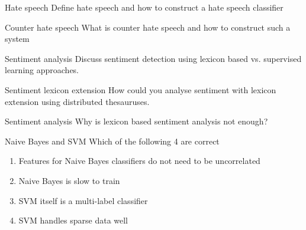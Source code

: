 \documentclass{article}
\begin{document}
\begin{exercise}{Hate speech}
  Define hate speech and how to construct a hate speech classifier

  \begin{solution}
  \end{solution}
\end{exercise}

\begin{exercise}{Counter hate speech}
  What is counter hate speech and how to construct such a system

  \begin{solution}
  \end{solution}
\end{exercise}

\begin{exercise}{Sentiment analysis}
  Discuss sentiment detection using lexicon based vs. supervised learning approaches.

  \begin{solution}
  \end{solution}
\end{exercise}

\begin{exercise}{Sentiment lexicon extension}
  How could you analyse sentiment with lexicon extension using distributed thesauruses.

  \begin{solution}
  \end{solution}
\end{exercise}

\begin{exercise}{Sentiment analysis}
  Why is lexicon based sentiment analysis not enough?

  \begin{solution}
  \end{solution}
\end{exercise}

\begin{exercise}{Naive Bayes and SVM}
  Which of the following 4 are correct
  \begin{enumerate}
    \item Features for Naive Bayes classifiers do not need to be uncorrelated
    \item Naive Bayes is slow to train
    \item SVM itself is a multi-label classifier
    \item SVM handles sparse data well
  \end{enumerate}

  \begin{solution}
  \end{solution}
\end{exercise}
\end{document}
